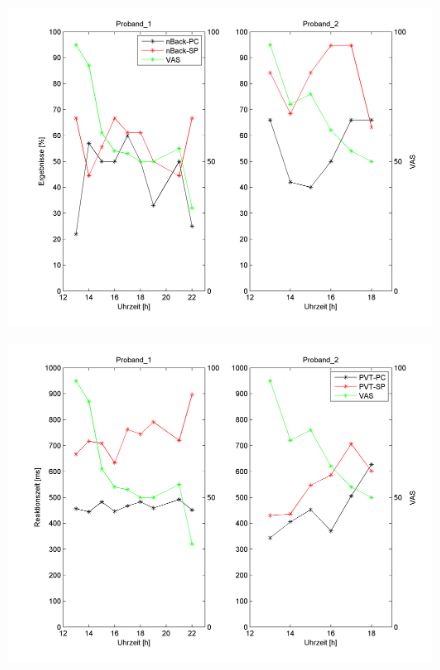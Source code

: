 \begin{frame}
\begin{figure}[hbtp]
 \centering
 \includegraphics[width=0.9\linewidth]{pictures/n-back_results}

 \label{fig:studie2-n-back}
\end{figure}

\end{frame}
\begin{frame}
\begin{figure}
 \includegraphics[width=0.9\linewidth]{pictures/pvt_results}

 \label{fig:studie2-pvt}
 \end{figure}

\end{frame}
